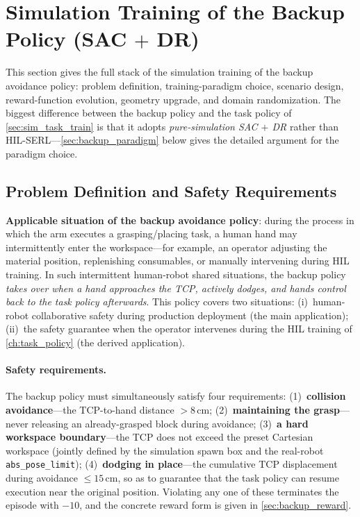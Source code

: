 \section{Simulation Training of the Backup Policy (SAC $+$ DR)}\label{sec:backup_sim_train}

This section gives the full stack of the simulation training of the backup avoidance policy: problem definition, training-paradigm choice, scenario design, reward-function evolution, geometry upgrade, and domain randomization. The biggest difference between the backup policy and the task policy of \cref{sec:sim_task_train} is that it adopts \emph{pure-simulation SAC $+$ DR} rather than HIL-SERL---\cref{sec:backup_paradigm} below gives the detailed argument for the paradigm choice.

\subsection{Problem Definition and Safety Requirements}\label{sec:backup_problem}

\textbf{Applicable situation of the backup avoidance policy}: during the process in which the arm executes a grasping/placing task, a human hand may intermittently enter the workspace---for example, an operator adjusting the material position, replenishing consumables, or manually intervening during HIL training. In such intermittent human-robot shared situations, the backup policy \emph{takes over when a hand approaches the TCP, actively dodges, and hands control back to the task policy afterwards}. This policy covers two situations: (i)~human-robot collaborative safety during production deployment (the main application); (ii)~the safety guarantee when the operator intervenes during the HIL training of \cref{ch:task_policy} (the derived application).

\paragraph{Safety requirements.} The backup policy must simultaneously satisfy four requirements: (1)~\textbf{collision avoidance}---the TCP-to-hand distance $> 8\,\text{cm}$; (2)~\textbf{maintaining the grasp}---never releasing an already-grasped block during avoidance; (3)~\textbf{a hard workspace boundary}---the TCP does not exceed the preset Cartesian workspace (jointly defined by the simulation spawn box and the real-robot \texttt{abs\_pose\_limit}); (4)~\textbf{dodging in place}---the cumulative TCP displacement during avoidance $\leq 15\,\text{cm}$, so as to guarantee that the task policy can resume execution near the original position. Violating any one of these terminates the episode with $-10$, and the concrete reward form is given in \cref{sec:backup_reward}.

